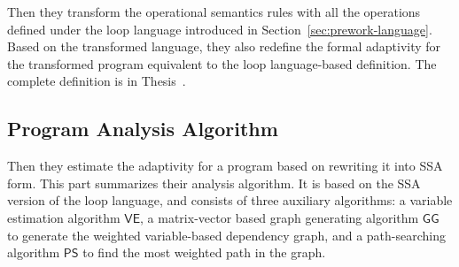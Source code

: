 Then they transform the operational semantics rules with all the operations defined under the loop language introduced in Section~\ref{sec:prework-language}.
Based on the transformed language, they also redefine the formal adaptivity for the transformed program equivalent to the
loop language-based definition. The complete definition is in Thesis~\cite{weihao22}.
%
\subsection*{Program Analysis Algorithm}
Then they estimate the adaptivity for a program based on rewriting it into SSA form.
This part summarizes
their analysis algorithm.
It is based on the SSA version of the loop language, and
consists of three auxiliary algorithms:
a variable estimation algorithm $\mathsf{VE}$, a matrix-vector based graph generating algorithm $\mathsf{GG}$ to generate the weighted variable-based dependency graph, and a path-searching algorithm $\mathsf{PS}$ to find the most weighted path in the graph.
%
